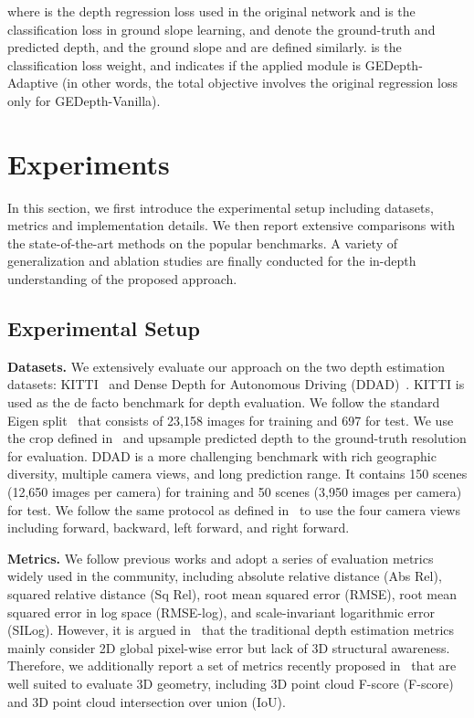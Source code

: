 \documentclass[10pt,twocolumn,letterpaper]{article}
\begin{document}
where  is the depth regression loss used in the original network and  is the classification loss in ground slope learning,  and  denote the ground-truth and predicted depth, and the ground slope  and  are defined similarly.  is the classification loss weight, and  indicates if the applied module is GEDepth-Adaptive (in other words, the total objective involves the original regression loss only for GEDepth-Vanilla).

\section{Experiments}
\label{section:experiments}
In this section, we first introduce the experimental setup including datasets, metrics and implementation details. We then report extensive comparisons with the state-of-the-art methods on the popular benchmarks. A variety of generalization and ablation studies are finally conducted for the in-depth understanding of the proposed approach. 

\subsection{Experimental Setup}
\label{section:setup}
\noindent\textbf{Datasets.} 
We extensively evaluate our approach on the two depth estimation datasets: KITTI~\cite{geiger2013vision} and Dense Depth for Autonomous Driving (DDAD)~\cite{guizilini20203d}. KITTI is used as the de facto benchmark for depth evaluation. We follow the standard Eigen split~\cite{eigen2014depth} that consists of 23,158 images for training and 697 for test. We use the crop defined in~\cite{garg2016unsupervised} and upsample predicted depth to the ground-truth resolution for evaluation. DDAD is a more challenging benchmark with rich geographic diversity, multiple camera views, and long prediction range. It contains 150 scenes (12,650 images per camera) for training and 50 scenes (3,950 images per camera) for test. We follow the same protocol as defined in~\cite{guizilini2021sparse} to use the four camera views including forward, backward, left forward, and right forward. 

\noindent\textbf{Metrics.} 
We follow previous works and adopt a series of evaluation metrics widely used in the community, including absolute relative distance (Abs Rel), squared relative distance (Sq Rel), root mean squared error (RMSE), root mean squared error in log space (RMSE-log), and scale-invariant logarithmic error (SILog). However, it is argued in~\cite{pinar20222d} that the traditional depth estimation metrics mainly consider 2D global pixel-wise error but lack of 3D structural awareness. Therefore, we additionally report a set of metrics recently proposed in~\cite{pinar20222d} that are well suited to evaluate 3D geometry, including 3D point cloud F-score (F-score) and 3D point cloud intersection over union (IoU).  
\end{document}
